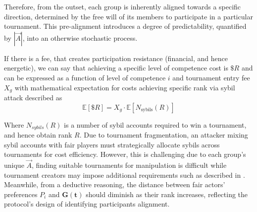 \documentclass{article}
\begin{document}
\begin{CJK}{UTF8}{gbsn}
\begin{multicols}{2}
        Therefore, from the outset, each group is inherently aligned towards a specific direction, determined by the free will of its members to participate in a particular tournament. This pre-alignment introduces a degree of predictability, quantified by $|\vec{A}|$, into an otherwise stochastic process.


        If there is a fee, that creates participation resistance (financial, and hence energetic), we can say that achieving a specific level of competence cost is $\$R$ and can be expressed as a function of level of competence $i$ and tournament entry fee $X_g$ with mathematical expectation for costs achieving specific rank via sybil attack described as
            \begin{equation}
                \mathbb{E}[\$R] = X_g \cdot \mathbb{E}[N_{\text{sybils}}(R)]
            \end{equation}


            Where $N_{sybils}(R)$ is a number of sybil accounts required to win a tournament, and hence obtain rank $R$. Due to tournament fragmentation, an attacker mixing sybil accounts with fair players must strategically allocate sybils across tournaments for cost efficiency. However, this is challenging due to each group's unique $\vec{A}$, finding suitable tournaments for manipulation is difficult while tournament creators may impose additional requirements such as described in \cite{sheng2024bftpolocbyzantinefortifiedtrigonometric}\cite{WorldCoin2024}.  Meanwhile, from a deductive reasoning, the distance between fair actors' preferences $P_i$ and $\mathbf{G(t)}$ should diminish as their rank increases, reflecting the protocol's design of identifying participants alignment.



\end{multicols}
\end{CJK}
\end{document}
